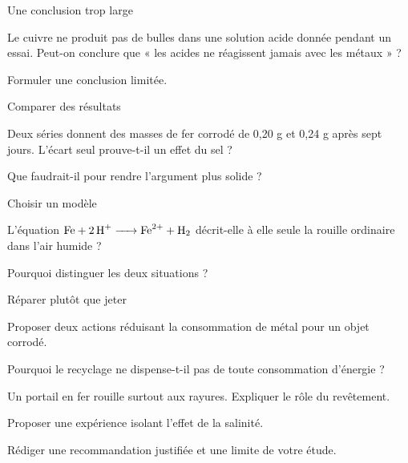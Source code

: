 \par\noindent\begin{minipage}{\linewidth}
\begin{exercice}[3]{Une conclusion trop large}
\begin{questions}
\item Le cuivre ne produit pas de bulles dans une solution acide donnée pendant un essai. Peut-on conclure que « les acides ne réagissent jamais avec les métaux » ?
\item Formuler une conclusion limitée.
\end{questions}
\end{exercice}
\end{minipage}
\par\noindent\begin{minipage}{\linewidth}
\begin{exercice}[3]{Comparer des résultats}
\begin{questions}
\item Deux séries donnent des masses de fer corrodé de 0,20 g et 0,24 g après sept jours. L’écart seul prouve-t-il un effet du sel ?
\item Que faudrait-il pour rendre l’argument plus solide ?
\end{questions}
\end{exercice}
\end{minipage}
\par\noindent\begin{minipage}{\linewidth}
\begin{exercice}[3]{Choisir un modèle}
\begin{questions}
\item L’équation $\ce{Fe + 2 H+ -> Fe^{2+} + H2}$ décrit-elle à elle seule la rouille ordinaire dans l’air humide ?
\item Pourquoi distinguer les deux situations ?
\end{questions}
\end{exercice}
\end{minipage}
\par\noindent\begin{minipage}{\linewidth}
\begin{exercice}[3]{Réparer plutôt que jeter}
\begin{questions}
\item Proposer deux actions réduisant la consommation de métal pour un objet corrodé.
\item Pourquoi le recyclage ne dispense-t-il pas de toute consommation d’énergie ?
\end{questions}
\end{exercice}
\end{minipage}
\label{defi-ex-5}
\begin{questions}
\item Un portail en fer rouille surtout aux rayures. Expliquer le rôle du revêtement.
\item Proposer une expérience isolant l’effet de la salinité.
\item Rédiger une recommandation justifiée et une limite de votre étude.
\end{questions}
\pcGrille
